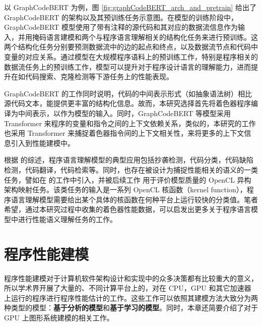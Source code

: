 以 GraphCodeBERT 为例，图 \ref{fig:graphCodeBERT_arch_and_pretrain} 给出了 GraphCodeBERT 的架构以及其预训练任务示意图。在模型的训练阶段中，GraphCodeBERT 模型使用了带有注释的源代码和其对应的数据流信息作为输入，并用掩码语言建模和两个与程序语言理解相关的结构化任务来进行预训练。这两个结构化任务分别要预测数据流中的边的起点和终点，以及数据流节点和代码中变量的对应关系。通过模型在大规模程序语料上的预训练工作，特别是程序相关的数据流任务上的预训练工作，模型可以提升对于程序设计语言的理解能力，进而提升在如代码搜索、克隆检测等下游任务上的性能表现。

GraphCodeBERT {\amend 的工作同时说明}，代码的中间表示形式（如抽象语法树）相比源代码文本，能提供更丰富的结构化信息。故而，本研究选择首先将着色器程序编译为中间表示，以作为模型的输入。同时，GraphCodeBERT 等模型采用 Transformer 来程序的变量和指令之间的上下文依赖关系，类似的，本研究的工作也采用 Transformer 来捕捉着色器指令间的上下文相关性，来将更多的上下文信息引入到性能建模中。

根据 \citet{ijcai2022p775} 的综述，程序语言理解模型的典型应用包括抄袭检测，代码分类，代码缺陷检测，代码翻译，代码检索等。同时，也存在被设计为捕捉性能相关的语义的一类任务，譬如在 \citet{8091247} 的工作中引入，并被后续工作 \cite{pmlr-v139-peng21b, pmlr-v139-cummins21a} 用于评价模型质量的 OpenCL 异构架构映射任务。该类任务的输入是一系列 OpenCL 核函数（kernel function），程序语言理解模型需要给出某个具体的核函数在何种平台上运行较快的分类值。笔者希望，通过本研究过程中收集的着色器性能数据，可以启发出更多关于程序语言模型中进行性能语义理解任务的工作。

\section{程序性能建模}

程序性能建模对于计算机软件架构设计和实现中的众多决策都有比较重大的意义，所以学术界开展了大量的、不同计算平台上的，对在 CPU，GPU 和其它加速器上运行的程序进行程序性能估计的工作。这些工作可以依照其建模方法大致分为两种类型的模型：\textbf{基于分析的模型}和\textbf{基于学习的模型}。同时，本章还简要介绍了对于 GPU 上图形系统建模的相关工作。


